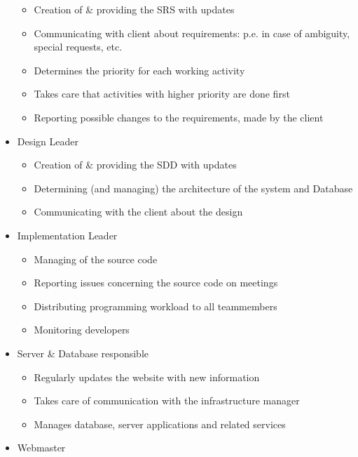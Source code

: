 \documentclass[12pt]{article}
\begin{document}
\begin{itemize}
  \begin{itemize}
  \itemsep1pt\parskip0pt
  \item
    Creation of \& providing the SRS with updates
  \item
    Communicating with client about requirements: p.e. in case of
    ambiguity, special requests, etc.
  \item
    Determines the priority for each working activity
  \item
    Takes care that activities with higher priority are done first
  \item
    Reporting possible changes to the requirements, made by the client
  \end{itemize}
\item
  Design Leader

  \begin{itemize}
  \itemsep1pt\parskip0pt
  \item
    Creation of \& providing the SDD with updates
  \item
    Determining (and managing) the architecture of the system and
    Database
  \item
    Communicating with the client about the design
  \end{itemize}
\item
  Implementation Leader

  \begin{itemize}
  \itemsep1pt\parskip0pt
  \item
    Managing of the source code
  \item
    Reporting issues concerning the source code on meetings
  \item
    Distributing programming workload to all teammembers
  \item
    Monitoring developers
  \end{itemize}
\item
  Server \& Database responsible

  \begin{itemize}
  \itemsep1pt\parskip0pt
  \item
    Regularly updates the website with new information
  \item
    Takes care of communication with the infrastructure manager
  \item
    Manages database, server applications and related services
  \end{itemize}
\item
  Webmaster


\end{itemize}
\end{document}
